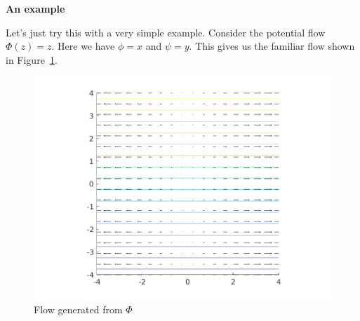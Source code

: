 \documentclass{article}
\begin{document}
\textbf{An example}

Let's just try this with a very simple example. Consider the potential
flow $\Phi(z) = z$. Here we have $\phi = x$ and $\psi = y$. This gives
us the familiar flow shown in Figure~\ref{fig:mt-1}.
%
\begin{figure}[!ht]
    \includegraphics[width=35em]{mt_ex1_1}
    \centering
    \caption{Flow generated from $\Phi$}
    \label{fig:mt-1}
\end{figure}
\end{document}

